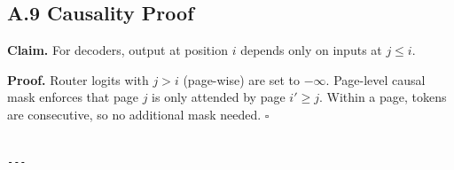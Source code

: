 \subsection{A.9 Causality Proof}

\textbf{Claim.} For decoders, output at position $i$ depends only on inputs at $j \leq i$.

\textbf{Proof.} Router logits with $j > i$ (page-wise) are set to $-\infty$. 
Page-level causal mask enforces that page $j$ is only attended by page $i' \geq j$. Within a page, tokens are consecutive, so no additional mask needed. $\square$
\begin{lstlisting}

---
\end{lstlisting}